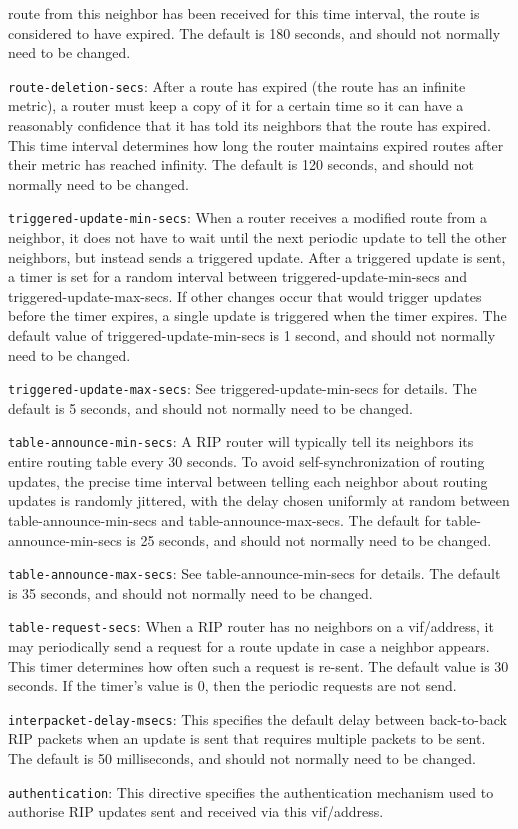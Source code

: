 \begin{description}
\begin{description}
  route from this neighbor has been received for this time interval,
  the route is considered to have expired. The default is 180 seconds,
  and should not normally need to be changed.
\item{\tt route-deletion-secs}: After a route has expired (the
  route has an infinite metric), a router must keep a copy of it for a
  certain time so it can have a reasonably confidence that it has told
  its neighbors that the route has expired.  This time interval
  determines how long the router maintains expired routes after their
  metric has reached infinity. The default is 120 seconds, and should
  not normally need to be changed.  
\item{\tt triggered-update-min-secs}: When a router receives a
  modified route from a neighbor, it does not have to wait until the
  next periodic update to tell the other neighbors, but instead sends
  a triggered update.  After a triggered update is sent, a timer is
  set for a random interval between {\stt triggered-update-min-secs}
  and {\stt triggered-update-max-secs}.  If other changes occur that
  would trigger updates before the timer expires, a single update is
  triggered when the timer expires.  The default value of {\stt
  triggered-update-min-secs} is 1 second, and should not normally need
  to be changed.
\item{\tt triggered-update-max-secs}: See {\stt
  triggered-update-min-secs} for details.  The default is 5 seconds,
  and should not normally need to be changed.
\item{\tt table-announce-min-secs}: A RIP router will typically tell
  its neighbors its entire routing table every 30 seconds.  To avoid
  self-synchronization of routing updates, the precise time interval
  between telling each neighbor about routing updates is randomly
  jittered, with the delay chosen uniformly at random between {\stt
  table-announce-min-secs} and {\stt table-announce-max-secs}.  The
  default for {\stt table-announce-min-secs} is 25 seconds, and should
  not normally need to be changed.
\item{\tt table-announce-max-secs}: See {\stt table-announce-min-secs}
  for details.  The default is 35 seconds, and should not normally
  need to be changed.
\item{\tt table-request-secs}: When a RIP router has no neighbors on a
  vif/address, it may periodically send a request for a route update
  in case a neighbor appears.  This timer determines how often such a
  request is re-sent. The default value is 30 seconds.
  If the timer's value is 0, then the periodic requests are not send.
\item{\tt interpacket-delay-msecs}: This specifies the default delay
  between back-to-back RIP packets when an update is sent that
  requires multiple packets to be sent.  The default is 50
  milliseconds, and should not normally need to be changed.
\item{\tt authentication}: This directive specifies the authentication
mechanism used to authorise RIP updates sent and received via this
vif/address.  


\end{description}
\end{description}
